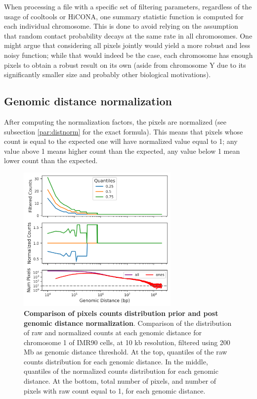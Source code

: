 When processing a file with a specific set of filtering parameters, regardless of the usage of cooltools or HiCONA, one summary statistic function is computed for each individual chromosome. This is done to avoid relying on the assumption that random contact probability decays at the same rate in all chromosomes. One might argue that considering all pixels jointly would yield a more robust and less noisy function; while that would indeed be the case, each chromosome has enough pixels to obtain a robust result on its own (aside from chromosome Y due to its significantly smaller size and probably other biological motivations).


\subsection{Genomic distance normalization}

After computing the normalization factors, the pixels are normalized (see subsection \ref{par:distnorm} for the exact formula). This means that pixels whose count is equal to the expected one will have normalized value equal to 1; any value above 1 means higher count than the expected, any value below 1 mean lower count than the expected. 

\begin{figure}[ht]
  \centering
  \includegraphics[width=0.7\textwidth]{normalization_stats.png}
  \caption{\textbf{Comparison of pixels counts distribution prior and post genomic distance normalization}. Comparison of the distribution of raw and normalized counts at each genomic distance for chromosome 1 of IMR90 cells, at 10 kb resolution, filtered using 200 Mb as genomic distance threshold. At the top, quantiles of the raw counts distribution for each genomic distance. In the middle, quantiles of the normalized counts distribution for each genomic distance. At the bottom, total number of pixels, and number of pixels with raw count equal to 1, for each genomic distance.}
  \label{fig:normstats}
\end{figure}

